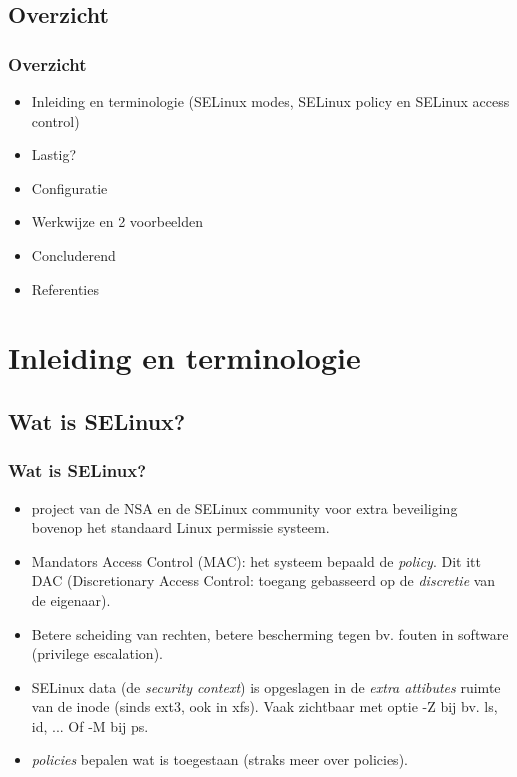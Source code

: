 \subsection{Overzicht}
\begin{styleframe}
	\frametitle{Overzicht}
\begin{itemize}
	\item Inleiding en terminologie (SELinux modes, SELinux policy en SELinux access control)
	\item Lastig?
	\item Configuratie
	\item Werkwijze en 2 voorbeelden
	\item Concluderend
	\item Referenties
\end{itemize}
\end{styleframe}

\section{Inleiding en terminologie}
\subsection{Wat is SELinux?}
\begin{styleframe}
	\frametitle{Wat is SELinux?}
\begin{itemize}
	\pause
	\item project van de NSA en de SELinux community voor extra beveiliging bovenop het standaard Linux permissie systeem.
	\pause
	\item Mandators Access Control (MAC): het systeem bepaald de {\it policy}. Dit itt DAC (Discretionary Access Control: toegang gebasseerd op de {\it discretie} van de eigenaar).
	\pause
	\item Betere scheiding van rechten, betere bescherming tegen bv. fouten in software (privilege escalation).
	\pause
	\item SELinux data (de {\it security context}) is opgeslagen in de {\it extra attibutes} ruimte van de inode (sinds ext3, ook in xfs). Vaak zichtbaar met optie -Z bij bv. ls, id, ... Of -M bij ps.
	\pause
	\item {\it policies} bepalen wat is toegestaan (straks meer over policies).
\end{itemize}
\end{styleframe}

